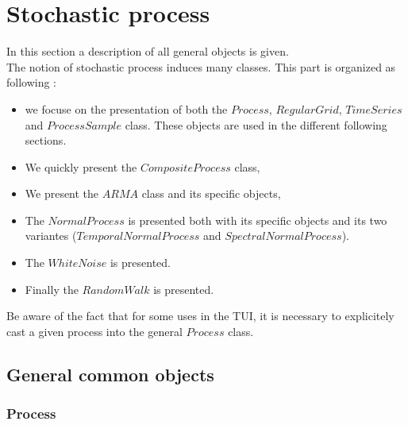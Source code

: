 \newpage\section{Stochastic process}

In this section a description of all general objects is given. \\
The notion of stochastic process induces many classes. This part is organized as following :
\begin{itemize}
\item we focuse on the presentation of both the $Process$, $RegularGrid$, $TimeSeries$ and $ProcessSample$ class.
These objects are used in the different following sections.
\item We quickly present the $CompositeProcess$ class,
\item We present the $ARMA$ class and its specific objects,
\item The $NormalProcess$ is presented both with its specific objects and its two variantes ($TemporalNormalProcess$ and $SpectralNormalProcess$).
\item The $WhiteNoise$ is presented. \\
\item Finally the $RandomWalk$ is presented. \\
\end{itemize}

Be aware of the fact that for some uses in the TUI, it is necessary to explicitely cast a given process into the general $Process$ class.


\newpage \subsection{General common objects}

\subsubsection{Process}


